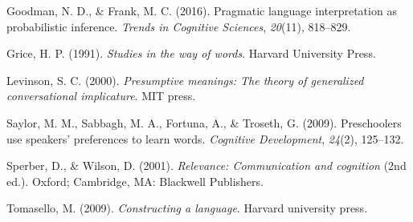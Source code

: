 \documentclass[10pt, letterpaper]{article}
\begin{document}
\hypertarget{ref-goodman2016pragmatic}{}
Goodman, N. D., \& Frank, M. C. (2016). Pragmatic language
interpretation as probabilistic inference. \emph{Trends in Cognitive
Sciences}, \emph{20}(11), 818--829.

\hypertarget{ref-grice1991studies}{}
Grice, H. P. (1991). \emph{Studies in the way of words}. Harvard
University Press.

\hypertarget{ref-levinson2000presumptive}{}
Levinson, S. C. (2000). \emph{Presumptive meanings: The theory of
generalized conversational implicature}. MIT press.

\hypertarget{ref-saylor2009preschoolers}{}
Saylor, M. M., Sabbagh, M. A., Fortuna, A., \& Troseth, G. (2009).
Preschoolers use speakers' preferences to learn words. \emph{Cognitive
Development}, \emph{24}(2), 125--132.

\hypertarget{ref-sperber2001relevance}{}
Sperber, D., \& Wilson, D. (2001). \emph{Relevance: Communication and
cognition} (2nd ed.). Oxford; Cambridge, MA: Blackwell Publishers.

\hypertarget{ref-tomasello2009constructing}{}
Tomasello, M. (2009). \emph{Constructing a language}. Harvard university
press.


\end{document}
